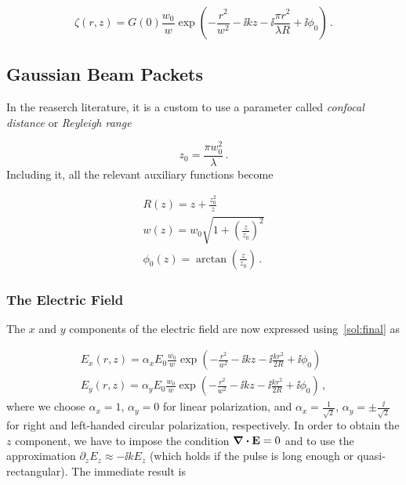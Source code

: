 \documentclass[12pt, class=report, crop=false]{standalone}
\begin{document}
\begin{equation}
  \label{sol:final}
  \zeta(r,z) = G(0)\frac{w_0}{w} \exp(-\frac{r^2}{w^2}  -\ii k z -\ii \frac{\pi r^2}{\lambda R} + \ii \phi_0)\,.
\end{equation}

\subsection{Gaussian Beam Packets}

In the reaserch literature, it is a custom to use a parameter called \textit{confocal distance} or \textit{Reyleigh range}

\begin{equation}
  z_0=\frac{\pi w_0^2}{\lambda} \,.
\end{equation}
Including it, all the relevant auxiliary functions become

\begin{subequations}
  \begin{align}
    R(z) = z+\frac{z_0^2}{z} \\
    w(z) = w_0 \sqrt{1+\left( \frac{z}{z_0}\right)^2}\\
    \phi_0 (z) = \arctan(\frac{z}{z_0}) \,.
  \end{align}
\end{subequations}

\subsubsection{The Electric Field}
The \(x\) and \(y\) components of the electric field are now expressed using~\cref{sol:final} as

\begin{subequations}
  \label{def:gauss-beam-fields-xy}
  \begin{align}
    E_x (r,z) = \alpha_x E_0 \frac{w_0}{w} \exp(-\frac{r^2}{w^2}  -\ii k z -\ii \frac{k r^2}{2 R} + \ii \phi_0)\\
    E_y (r,z) = \alpha_y E_0 \frac{w_0}{w} \exp(-\frac{r^2}{w^2}  -\ii k z -\ii \frac{k r^2}{2 R} + \ii \phi_0)\,,
  \end{align}
\end{subequations}
where we choose \(\alpha_x=1\), \(\alpha_y=0\) for linear polarization, and \(\alpha_x=\frac{1}{\sqrt{2}}\), \(\alpha_y=\pm \frac{\ii}{\sqrt{2}}\) for right and left-handed circular polarization, respectively. In order to obtain the \(z\) component, we have to impose the condition \(\div{\vb{E}} = 0\) and to use the approximation \(\partial_z E_z \approx -\ii k E_z\) (which holds if the pulse is long enough or quasi-rectangular). The immediate result is
\end{document}
